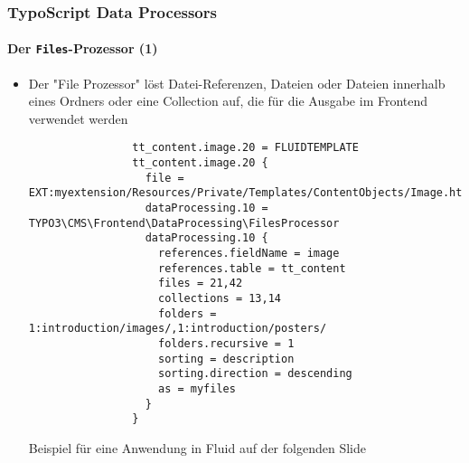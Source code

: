 
\begin{frame}[fragile]
	\frametitle{TypoScript Data Processors}
	\framesubtitle{Der \texttt{Files}-Prozessor (1)}

	\lstset{basicstyle=\tiny\ttfamily}

	\begin{itemize}

		\item Der "File Prozessor" löst Datei-Referenzen, Dateien oder Dateien innerhalb eines
			Ordners oder eine Collection auf, die für die Ausgabe im Frontend verwendet werden

			\begin{lstlisting}
				tt_content.image.20 = FLUIDTEMPLATE
				tt_content.image.20 {
				  file = EXT:myextension/Resources/Private/Templates/ContentObjects/Image.html
				  dataProcessing.10 = TYPO3\CMS\Frontend\DataProcessing\FilesProcessor
				  dataProcessing.10 {
				    references.fieldName = image
				    references.table = tt_content
				    files = 21,42
				    collections = 13,14
				    folders = 1:introduction/images/,1:introduction/posters/
				    folders.recursive = 1
				    sorting = description
				    sorting.direction = descending
				    as = myfiles
				  }
				}
			\end{lstlisting}

			\small
				Beispiel für eine Anwendung in Fluid auf der folgenden Slide
			\normalsize

	\end{itemize}

\end{frame}


